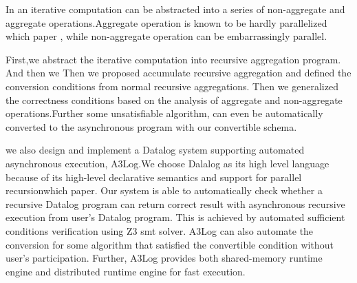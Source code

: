 In an iterative computation can be abstracted into a series of non-aggregate and aggregate operations.Aggregate operation is known to be hardly parallelized{\color{red} which paper} \cite{distribute aggregate from ms}, while non-aggregate operation can be embarrassingly parallel.

First,we abstract the iterative computation into recursive aggregation program. And then we  Then we proposed accumulate recursive aggregation and defined the conversion conditions from normal recursive aggregations. Then we generalized the correctness conditions based on the analysis of aggregate and non-aggregate operations.Further some unsatisfiable algorithm, can even be automatically converted to the asynchronous program with our convertible schema.

we also design and implement a Datalog system supporting automated asynchronous execution, A3Log.We choose Dalalog as its high level language because of its high-level declarative semantics and support for parallel recursion{\color{red}which paper}\cite{}. Our system is able to automatically check whether a recursive Datalog program can return correct result with asynchronous recursive execution from user's Datalog program. This is achieved by automated sufficient conditions verification using Z3 smt solver. 
A3Log can also automate the conversion for some algorithm that satisfied the convertible condition without user's participation. Further, A3Log provides both shared-memory runtime engine and distributed runtime engine for fast execution.


